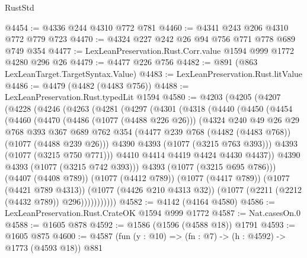 \begin{lexlean}{RustStd}
\begin{coremodule}
@4454 := @4336 @244 @4310 @772 @781
@4460 := @4341 @243 @206 @4310 @772 @779 @723
@4470 := @4324 @227 @242 @26 @94 @756 @771 @778 @689 @749 @354
@4477 := LexLeanPreservation.Rust.Corr.value @1594 @999 @1772 @4280 @296 @26
@4479 := @4477 @226 @756
@4482 := @891 (@863 LexLeanTarget.TargetSyntax.Value)
@4483 := LexLeanPreservation.Rust.litValue
@4486 := @4479 (@4482 (@4483 @756))
@4488 := LexLeanPreservation.Rust.typedLit @1594
@4580 := @4203
    (@4205
      (@4207
        (@4228
          (@4246
            (@4263
              (@4281
                (@4297
                  (@4301
                    (@4318
                      (@4440
                        (@4450
                          (@4454
                            (@4460
                              (@4470
                                (@4486 (@1077 (@4488 @226 @26)))
                                (@4324
                                  @240
                                  @49
                                  @26
                                  @29
                                  @768
                                  @393
                                  @367
                                  @689
                                  @762
                                  @354
                                  (@4477 @239 @768 (@4482 (@4483 @768)) (@1077 (@4488 @239 @26)))
                                  @4390
                                  @4393
                                  (@1077 (@3215 @763 @393)))
                                @4393
                                (@1077 (@3215 @750 @771)))
                              @4410
                              @4414
                              @4419
                              @4424
                              @4430
                              @4437))
                          @4390
                          @4393
                          (@1077 (@3215 @742 @393)))
                        @4393
                        (@1077 (@3215 @695 @786)))
                      (@4407 (@4408 @789))
                      (@1077 (@4412 @789))
                      (@1077 (@4417 @789))
                      (@1077 (@4421 @789 @4313))
                      (@1077 (@4426 @210 @4313 @32))
                      (@1077 (@2211 (@2212 (@4432 @789)) @296)))))))))))
@4582 := @4142 (@4164 @4580)
@4586 := LexLeanPreservation.Rust.CrateOK @1594 @999 @1772
@4587 := Nat.casesOn.{0}
@4588 := @1605 @878
@4592 := @1586 (@1596 (@4588 @18)) @1791
@4593 := @1605 @875
@4600 := @4587 (fun (y : @10) => (fn : @7) -> (h : @4592) -> @1773 (@4593 @18)) @881

\end{coremodule}
\end{lexlean}
